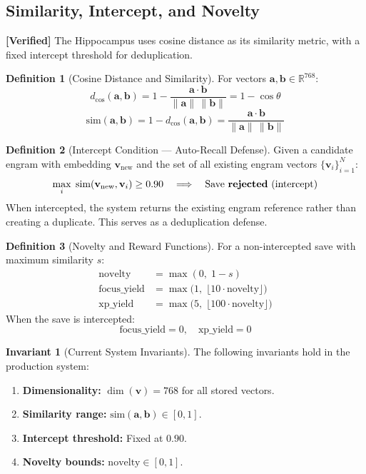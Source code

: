 \documentclass[11pt]{article}
\newcommand{\verified}{\textcolor{verifiedgreen}{\textbf{[Verified]}}}
\theoremstyle{definition}
\newtheorem{definition}{Definition}[section]
\newtheorem{invariant}{Invariant}[section]
\theoremstyle{remark}
\begin{document}
\subsection{Similarity, Intercept, and Novelty}

\verified{} The Hippocampus uses cosine distance as its similarity metric,
with a fixed intercept threshold for deduplication.

\begin{definition}[Cosine Distance and Similarity]
\label{def:cosine}
For vectors $\mathbf{a}, \mathbf{b} \in \mathbb{R}^{768}$:
\[
  d_{\cos}(\mathbf{a}, \mathbf{b})
    = 1 - \frac{\mathbf{a} \cdot \mathbf{b}}
               {\|\mathbf{a}\| \, \|\mathbf{b}\|}
    = 1 - \cos\theta
\]
\[
  \text{sim}(\mathbf{a}, \mathbf{b}) = 1 - d_{\cos}(\mathbf{a}, \mathbf{b})
    = \frac{\mathbf{a} \cdot \mathbf{b}}{\|\mathbf{a}\| \, \|\mathbf{b}\|}
\]
\end{definition}

\begin{definition}[Intercept Condition --- Auto-Recall Defense]
\label{def:intercept}
Given a candidate engram with embedding $\mathbf{v}_{\text{new}}$ and the set
of all existing engram vectors $\{\mathbf{v}_i\}_{i=1}^{N}$:
\[
  \max_{i} \; \text{sim}(\mathbf{v}_{\text{new}}, \mathbf{v}_i) \geq 0.90
  \quad \Longrightarrow \quad \text{Save \textbf{rejected} (intercept)}
\]
When intercepted, the system returns the existing engram reference rather than
creating a duplicate. This serves as a deduplication defense.
\end{definition}

\begin{definition}[Novelty and Reward Functions]
\label{def:novelty}
For a non-intercepted save with maximum similarity $s$:
\begin{align}
  \text{novelty} &= \max(0, \; 1 - s) \\[0.5em]
  \text{focus\_yield} &= \max\!\big(1, \; \lfloor 10 \cdot \text{novelty} \rfloor\big) \\[0.3em]
  \text{xp\_yield} &= \max\!\big(5, \; \lfloor 100 \cdot \text{novelty} \rfloor\big)
\end{align}
When the save is intercepted:
\[
  \text{focus\_yield} = 0, \quad \text{xp\_yield} = 0
\]
\end{definition}

\begin{invariant}[Current System Invariants]
\label{inv:current}
The following invariants hold in the production system:
\begin{enumerate}[nosep]
  \item \textbf{Dimensionality:} $\dim(\mathbf{v}) = 768$ for all stored vectors.
  \item \textbf{Similarity range:} $\text{sim}(\mathbf{a}, \mathbf{b}) \in [0, 1]$.
  \item \textbf{Intercept threshold:} Fixed at $0.90$.
  \item \textbf{Novelty bounds:} $\text{novelty} \in [0, 1]$.
\end{enumerate}
\end{invariant}
\end{document}

